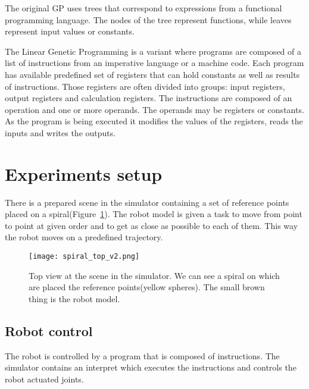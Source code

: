 \documentclass{ExcelAtFIT}
\begin{document}
The original GP uses trees that correspond to expressions from a functional programming language.
The nodes of the tree represent functions, while leaves represent input values or constants.

The Linear Genetic Programming is a variant where programs are composed of a list of instructions from an imperative language or a machine code.
Each program has available predefined set of registers that can hold constants as well as results of instructions.
Those registers are often divided into groups: input registers, output registers and calculation registers.
The instructions are composed of an operation and one or more operands.
The operands may be registers or constants.
As the program is being executed it modifies the values of the registers, reads the inputs and writes the outputs.


\section{Experiments setup}
\label{sec:ExperimentsSetup}
There is a prepared scene in the simulator containing a set of reference points placed on a spiral(Figure~\ref{fig:SpiralTop}).
The robot model is given a task to move from point to point at given order and to get as close as possible to each of them.
This way the robot moves on a predefined trajectory.

\begin{figure}[t]
\centering
{\texttt{[image: spiral\_top\_v2.png]}}
\caption{Top view at the scene in the simulator.
We can see a spiral on which are placed the reference points(yellow spheres).
The small brown thing is the robot model.}
\label{fig:SpiralTop}
\end{figure}


\subsection{Robot control}
The robot is controlled by a program that is composed of instructions.
The simulator contains an interpret which executes the instructions and controls the robot actuated joints.
\end{document}
